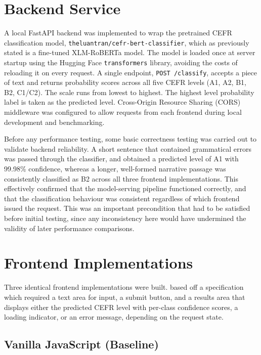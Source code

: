 \documentclass[11pt,a4paper]{report}
\begin{document}
\section{Backend Service}

A local FastAPI backend was implemented to wrap the pretrained CEFR classification model, \texttt{theluantran/cefr-bert-classifier}, which as previously stated is a fine-tuned XLM-RoBERTa model. The model is loaded once at server startup using the Hugging Face \texttt{transformers} library, avoiding the costs of reloading it on every request. A single endpoint, \texttt{POST
/classify}, accepts a piece of text and returns probability scores across all five CEFR levels (A1, A2, B1, B2, C1/C2). The scale runs from lowest to highest. The highest level probability label is taken as the predicted level. Cross-Origin Resource Sharing (CORS) middleware was configured to allow requests from each frontend during local development and benchmarking.

\vspace{5mm}

Before any performance testing, some basic correctness testing was carried out to validate backend reliability. A short sentence that contained grammatical errors was passed through the classifier, and obtained a predicted level of A1 with 99.98\% confidence, whereas a longer, well-formed narrative passage was consistently classified as B2 across all three frontend implementations. This effectively confirmed that the model-serving pipeline functioned correctly, and that the classification behaviour was consistent regardless of which frontend issued the request. 
This was an important precondition that had to be satisfied before initial testing, since any inconsistency here would have undermined the validity of later performance comparisons. 

\section{Frontend Implementations}

Three identical frontend implementations were built. based off a specification which required a text area for input, a submit button, and a results area that displays either the predicted CEFR level with per-class confidence scores, a loading indicator, or an error message, depending on the request state. 

\subsection{Vanilla JavaScript (Baseline)}
\end{document}
